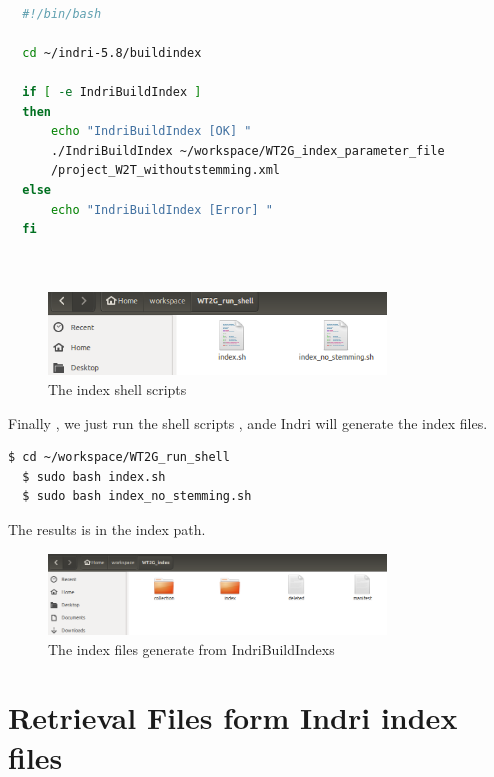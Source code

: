 \documentclass{article}
\begin{document}
\begin{lstlisting}[language=bash,caption={index\_no\_stemming.sh (no stemming)}]

  #!/bin/bash

  cd ~/indri-5.8/buildindex
  
  if [ -e IndriBuildIndex ]
  then
      echo "IndriBuildIndex [OK] "
      ./IndriBuildIndex ~/workspace/WT2G_index_parameter_file
      /project_W2T_withoutstemming.xml
  else
      echo "IndriBuildIndex [Error] "
  fi
  
  
\end{lstlisting}

\begin{figure}[H]
  \begin{center}
  \includegraphics[width=0.8\textwidth]{image/index_sh_folder.png}
  \caption{The index shell scripts }
  \label{fig:env_07}
  \end{center}
\end{figure}

Finally , we just run the shell scripts , ande Indri will generate the index files.


\begin{lstlisting}[language=bash,caption={ Run index shell scripts}]
  $ cd ~/workspace/WT2G_run_shell
  $ sudo bash index.sh
  $ sudo bash index_no_stemming.sh 
\end{lstlisting}
The results is in the index path.
\begin{figure}[H]
  \begin{center}
  \includegraphics[width=0.8\textwidth]{image/index_out_folder.png}
  \caption{The index files generate from  IndriBuildIndexs }
  \label{fig:env_07}
  \end{center}
\end{figure}

\section{Retrieval Files form Indri index files}
\end{document}
